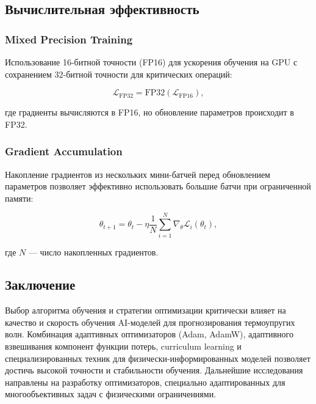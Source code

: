 \subsection{Вычислительная эффективность}

\subsubsection{Mixed Precision Training}

Использование 16-битной точности (FP16) для ускорения обучения на GPU с сохранением 32-битной точности для критических операций:

\begin{equation}
\mathcal{L}_{\text{FP32}} = \text{FP32}(\mathcal{L}_{\text{FP16}}),
\end{equation}

где градиенты вычисляются в FP16, но обновление параметров происходит в FP32.

\subsubsection{Gradient Accumulation}

Накопление градиентов из нескольких мини-батчей перед обновлением параметров позволяет эффективно использовать большие батчи при ограниченной памяти:

\begin{equation}
\theta_{t+1} = \theta_t - \eta \frac{1}{N} \sum_{i=1}^{N} \nabla_{\theta} \mathcal{L}_i(\theta_t),
\end{equation}

где $N$ — число накопленных градиентов.

\subsection{Заключение}

Выбор алгоритма обучения и стратегии оптимизации критически влияет на качество и скорость обучения AI-моделей для прогнозирования термоупругих волн. Комбинация адаптивных оптимизаторов (Adam, AdamW), адаптивного взвешивания компонент функции потерь, curriculum learning и специализированных техник для физически-информированных моделей позволяет достичь высокой точности и стабильности обучения. Дальнейшие исследования направлены на разработку оптимизаторов, специально адаптированных для многообъективных задач с физическими ограничениями.

